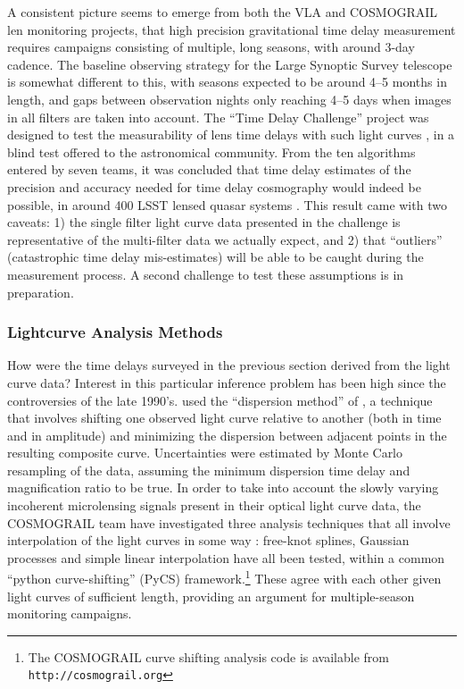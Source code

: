 A consistent picture seems to emerge from  both the VLA and COSMOGRAIL
len monitoring projects, that high precision  gravitational time delay
measurement requires campaigns consisting of  multiple, long seasons,
with around 3-day cadence. The baseline observing strategy for the Large
Synoptic Survey telescope is somewhat different to this, with seasons
expected to be  around 4--5 months in length, and gaps between
observation nights only reaching 4--5 days when images in all filters
are taken into account. The ``Time Delay Challenge'' project was
designed to test the measurability of lens time delays with such light
curves \citep{DoblerEtal2013}, in a blind test offered to the
astronomical community. From the ten algorithms entered by seven teams,
it was concluded that time delay estimates of the precision and accuracy
needed for time delay cosmography would indeed be possible, in around
400 LSST lensed quasar systems \citep{LiaoEtal2015}. This result came
with two caveats:  1) the single filter light curve data presented in
the challenge is representative of the  multi-filter data we actually
expect, and 2) that ``outliers'' (catastrophic time delay mis-estimates)
will be able to be caught during the measurement process.  A second
challenge to test these assumptions is in preparation.




\subsubsection{Lightcurve Analysis Methods}

How were the time delays surveyed in the previous section derived from
the light curve data? Interest in this particular inference problem has
been  high since the controversies of the late 1990's. \citet{Fas++99}
used  the ``dispersion method'' of \citet{Pelt++96}, a technique that
involves  shifting one observed light curve relative to another (both in
time and in  amplitude) and minimizing the dispersion between adjacent
points in the  resulting composite curve. Uncertainties were estimated
by Monte Carlo resampling  of the data, assuming the minimum dispersion
time delay and magnification ratio to be true. In order to take into
account the slowly varying incoherent microlensing signals present in
their optical light curve data, the COSMOGRAIL team have  investigated
three analysis techniques that all involve interpolation of the light
curves in some way \citep{TCM13}: free-knot splines, Gaussian processes
and simple linear interpolation have all been tested, within a common
``python curve-shifting'' (PyCS) framework.\footnote{The COSMOGRAIL curve
shifting analysis code is available from \texttt{http://cosmograil.org}}
These agree with each other given light curves of sufficient length,
providing an argument for multiple-season monitoring campaigns.

